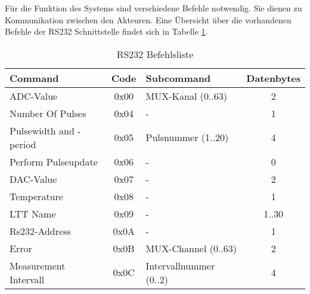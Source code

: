 Für die Funktion des Systems sind verschiedene Befehle notwendig. Sie dienen zu Kommunikation zwischen den Akteuren.
Eine Übersicht über die vorhandenen Befehle der RS232 Schnittstelle findet sich in Tabelle \ref{table_RS232Commands}.\\

\begin{table}[H]
\begin{center}
\begin{tabularx}{\textwidth}{|X|c|X|c|}\hline 
 Command & Code & Subcommand & Datenbytes \\ \hline \hline
 ADC-Value & 0x00 & MUX-Kanal (0..63) & 2  \\ \hline
 Number Of Pulses & 0x04 & - & 1  \\ \hline
 Pulsewidth and -period & 0x05 & Pulsnummer (1..20) & 4  \\ \hline
 Perform Pulseupdate & 0x06 & - & 0   \\ \hline
 DAC-Value & 0x07 & - & 2 \\ \hline
 Temperature & 0x08 & - & 1  \\ \hline
 LTT Name & 0x09 & - & 1..30  \\ \hline
 Rs232-Address & 0x0A & - & 1 \\ \hline
 Error & 0x0B & MUX-Channel (0..63) & 2  \\ \hline
 Measurement Intervall & 0x0C & Intervallnummer (0..2) & 4 \\ \hline
\end{tabularx}
\caption{RS232 Befehlsliste}
\label{table_RS232Commands}
\end{center}
\end{table}



